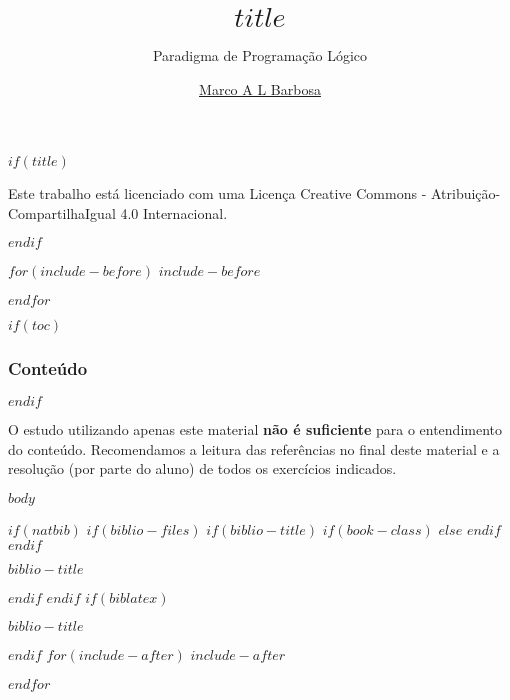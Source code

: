 \documentclass[$if(fontsize)$$fontsize$,$endif$$if(handout)$handout,$endif$$if(beamer)$ignorenonframetext,$endif$$for(classoption)$$classoption$$sep$,$endfor$]{$documentclass$}
\title{$title$}
\subtitle{Paradigma de Programação Lógico}
\author{\href{malbarbo.pro.br}{Marco A L Barbosa}}
\date{}
\begin{document}
$if(title)$
\begin{frame}[plain]
  \vspace{1.5cm}
  \titlepage
  \begin{center} 
    \href{http://creativecommons.org/licenses/by-sa/4.0/}{\ccbysa}

    {\tiny
      Este trabalho está licenciado com uma Licença Creative Commons -
      Atribuição-CompartilhaIgual 4.0 Internacional.
    }
  \end{center}
\end{frame}
$endif$

$for(include-before)$
$include-before$

$endfor$

$if(toc)$
\begin{frame}[plain]
  \frametitle{Conteúdo}
  \tableofcontents
\end{frame}
$endif$

\begin{frame}

  O estudo utilizando apenas este material \textbf{não é suficiente} para o
  entendimento do conteúdo. Recomendamos a leitura das referências no final
  deste material e a resolução (por parte do aluno) de todos os exercícios
  indicados.

\end{frame}

$body$

$if(natbib)$
$if(biblio-files)$
$if(biblio-title)$
$if(book-class)$
\renewcommand\bibname{$biblio-title$}
$else$
\renewcommand\refname{$biblio-title$}
$endif$
$endif$
\begin{frame}[allowframebreaks]{$biblio-title$}

\end{frame}

$endif$
$endif$
$if(biblatex)$
\begin{frame}[allowframebreaks]{$biblio-title$}
\printbibliography[heading=none]
\end{frame}

$endif$
$for(include-after)$
$include-after$

$endfor$
\end{document}
